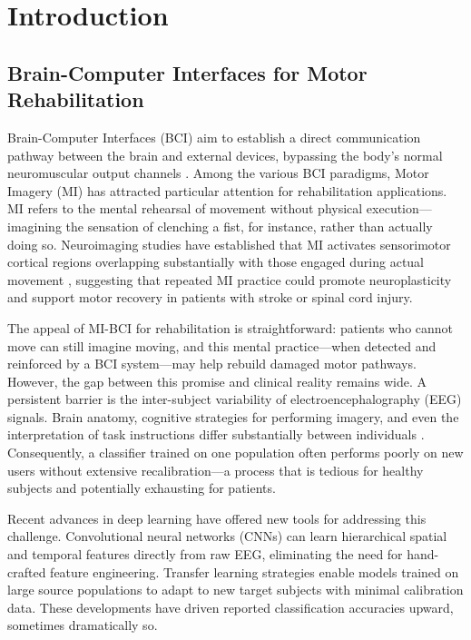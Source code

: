\chapter{Introduction}
\label{ch:introduction}

\section{Brain-Computer Interfaces for Motor Rehabilitation}
\label{sec:intro_context}

Brain-Computer Interfaces (BCI) aim to establish a direct communication pathway between the brain and external devices, bypassing the body's normal neuromuscular output channels \cite{wolpaw2002brain}. Among the various BCI paradigms, Motor Imagery (MI) has attracted particular attention for rehabilitation applications. MI refers to the mental rehearsal of movement without physical execution—imagining the sensation of clenching a fist, for instance, rather than actually doing so. Neuroimaging studies have established that MI activates sensorimotor cortical regions overlapping substantially with those engaged during actual movement \cite{pfurtscheller2001motor}, suggesting that repeated MI practice could promote neuroplasticity and support motor recovery in patients with stroke or spinal cord injury.

The appeal of MI-BCI for rehabilitation is straightforward: patients who cannot move can still imagine moving, and this mental practice—when detected and reinforced by a BCI system—may help rebuild damaged motor pathways. However, the gap between this promise and clinical reality remains wide. A persistent barrier is the inter-subject variability of electroencephalography (EEG) signals. Brain anatomy, cognitive strategies for performing imagery, and even the interpretation of task instructions differ substantially between individuals \cite{lotte2018review}. Consequently, a classifier trained on one population often performs poorly on new users without extensive recalibration—a process that is tedious for healthy subjects and potentially exhausting for patients.

Recent advances in deep learning have offered new tools for addressing this challenge. Convolutional neural networks (CNNs) can learn hierarchical spatial and temporal features directly from raw EEG, eliminating the need for hand-crafted feature engineering. Transfer learning strategies enable models trained on large source populations to adapt to new target subjects with minimal calibration data. These developments have driven reported classification accuracies upward, sometimes dramatically so.

